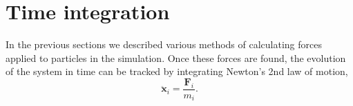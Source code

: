 \chapter{Time integration}
In the previous sections we described various methods of calculating forces applied to particles in the simulation.
Once these forces are found, the evolution of the system in time can be tracked by integrating Newton's 2nd law of motion,
\begin{equation}\label{eq:newtons-second}
    \ddot{\mathbf{x}}_i = \frac{\mathbf{F}_i}{m_i}.
\end{equation}


